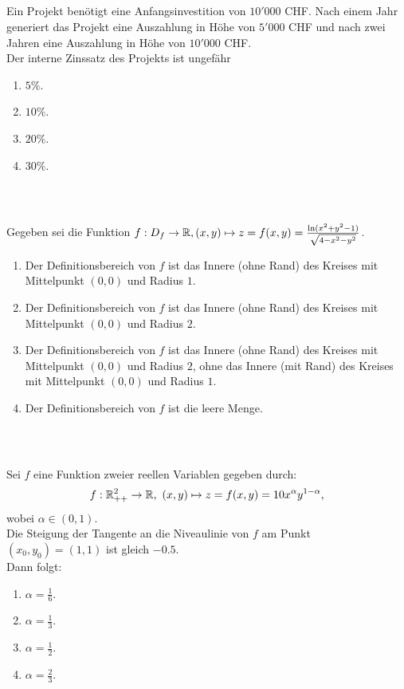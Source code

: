 \subsection*{}
Ein Projekt benötigt eine Anfangsinvestition von $ 10'000 $ CHF.
Nach einem Jahr generiert das Projekt eine Auszahlung in Höhe von $ 5'000  $ CHF und nach zwei Jahren eine Auszahlung in Höhe von $ 10'000 $ CHF.\\
Der interne Zinssatz des Projekts ist ungefähr
\renewcommand{\labelenumi}{(\alph{enumi})}
\begin{enumerate}
\item 
$ 5 \% $.
\item 
$ 10 \% $.
\item
$ 20 \% $.
\item
$ 30 \% $.
\end{enumerate}
\ \\
\subsection*{}
Gegeben sei die Funktion $ f :D_f \to \mathbb{R}, (x,y) \mapsto z = f(x,y) = \frac{\ln(x^2 +y^2 -1)}{\sqrt{4 - x^2 - y^2}} $.
\renewcommand{\labelenumi}{(\alph{enumi})}
\begin{enumerate}
\item 
Der Definitionsbereich von $ f  $ ist das Innere (ohne Rand) des Kreises mit Mittelpunkt $ (0,0) $ und Radius $ 1 $.
\item
Der Definitionsbereich von $ f  $ ist das Innere (ohne Rand) des Kreises mit Mittelpunkt $ (0,0) $ und Radius $ 2 $.
\item
Der Definitionsbereich von $ f  $ ist das Innere (ohne Rand) des Kreises mit Mittelpunkt $ (0,0) $ und Radius $ 2 $, ohne das Innere (mit Rand) des Kreises mit Mittelpunkt $ (0,0) $ und Radius $ 1 $.
\item
Der Definitionsbereich von $ f  $ ist die leere Menge.
\end{enumerate}
\ \\
\subsection*{}
Sei $ f $ eine Funktion zweier reellen Variablen gegeben durch:
\begin{align*}
	f: \mathbb{R}_{++}^2 \to \mathbb{R}, \ (x,y) \mapsto z = f(x,y) = 10 x^\alpha y^{1- \alpha},
\end{align*}
wobei $ \alpha \in (0,1) $.\\
Die Steigung der Tangente an die Niveaulinie von $ f $ am Punkt $ (x_0,y_0) = (1,1) $ ist gleich $ -0.5 $.\\
Dann folgt:
\renewcommand{\labelenumi}{(\alph{enumi})}
\begin{enumerate}
	\item 
	$ \alpha = \frac{1}{6}$.
	\item
	$ \alpha = \frac{1}{3}$.
	\item
	$ \alpha = \frac{1}{2}$.
	\item
	$ \alpha = \frac{2}{3}$.
\end{enumerate}
\ \\
